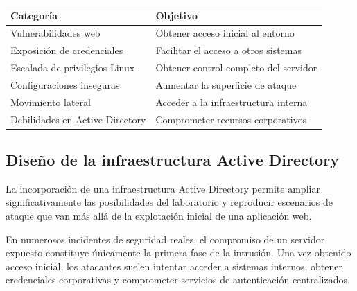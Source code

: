 \begin{table}[h]
    \centering

    \setlength{\arrayrulewidth}{0.05mm}

    \begin{tabular}{|C{5cm}|C{8cm}|}
        \hline
        \textbf{Categoría}              & \textbf{Objetivo}                     \\
        \hline
        Vulnerabilidades web            & Obtener acceso inicial al entorno     \\
        \hline
        Exposición de credenciales      & Facilitar el acceso a otros sistemas  \\
        \hline
        Escalada de privilegios Linux   & Obtener control completo del servidor \\
        \hline
        Configuraciones inseguras       & Aumentar la superficie de ataque      \\
        \hline
        Movimiento lateral              & Acceder a la infraestructura interna  \\
        \hline
        Debilidades en Active Directory & Comprometer recursos corporativos     \\
        \hline
    \end{tabular}

    \renewcommand{\arraystretch}{1}
    \label{tab:vulnerabilidades_laboratorio}
\end{table}

\vspace{0.5cm}


\subsection{Diseño de la infraestructura Active Directory}

La incorporación de una infraestructura Active Directory permite ampliar significativamente las posibilidades del laboratorio y reproducir escenarios de ataque que van más allá de la explotación inicial de una aplicación web.

En numerosos incidentes de seguridad reales, el compromiso de un servidor expuesto constituye únicamente la primera fase de la intrusión. Una vez obtenido acceso inicial, los atacantes suelen intentar acceder a sistemas internos, obtener credenciales corporativas y comprometer servicios de autenticación centralizados.


